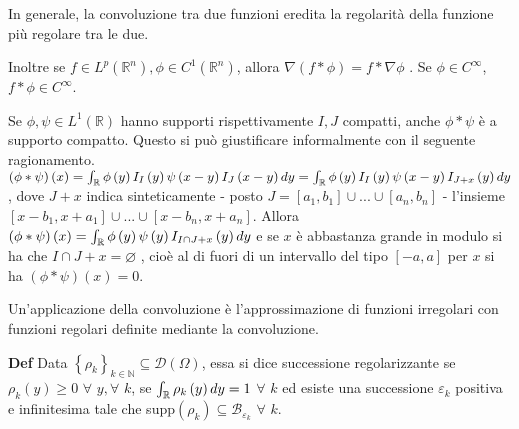\documentclass{article}
\begin{document}
In generale, la convoluzione tra due funzioni eredita la regolarit\`{a}
della funzione pi\`{u} regolare tra le due.

Inoltre se $f\in L^{p}\left( 
\mathbb{R}
^{n}\right) ,\phi \in C^{1}\left( 
\mathbb{R}
^{n}\right) $, allora $\nabla \left( f\ast \phi \right) =f\ast \nabla \phi $%
. Se $\phi \in C^{\infty }$, $f\ast \phi \in C^{\infty }$.

Se $\phi ,\psi \in L^{1}\left( 
\mathbb{R}
\right) $ hanno supporti rispettivamente $I,J$ compatti, anche $\phi \ast
\psi $ \`{e} a supporto compatto. Questo si pu\`{o} giustificare
informalmente con il seguente ragionamento. $\left( \phi \ast \psi \right)
\left( x\right) =\int_{%
\mathbb{R}
}\phi \left( y\right) I_{I}\left( y\right) \psi \left( x-y\right)
I_{J}\left( x-y\right) dy=\int_{%
\mathbb{R}
}\phi \left( y\right) I_{I}\left( y\right) \psi \left( x-y\right)
I_{J+x}\left( y\right) dy$, dove $J+x$ indica sinteticamente - posto $J=%
\left[ a_{1},b_{1}\right] \cup ...\cup \left[ a_{n},b_{n}\right] $ -
l'insieme $\left[ x-b_{1},x+a_{1}\right] \cup ...\cup \left[ x-b_{n},x+a_{n}%
\right] $. Allora $\left( \phi \ast \psi \right) \left( x\right) =\int_{%
\mathbb{R}
}\phi \left( y\right) \psi \left( y\right) I_{I\cap J+x}\left( y\right) dy$
e se $x$ \`{e} abbastanza grande in modulo si ha che $I\cap J+x=\varnothing $%
, cio\`{e} al di fuori di un intervallo del tipo $\left[ -a,a\right] $ per $%
x $ si ha $\left( \phi \ast \psi \right) \left( x\right) =0$.

Un'applicazione della convoluzione \`{e} l'approssimazione di funzioni
irregolari con funzioni regolari definite mediante la convoluzione.

\textbf{Def} Data $\left\{ \rho _{k}\right\} _{k\in 
\mathbb{N}
}\subseteq \mathcal{D}\left( \Omega \right) $, essa si dice successione
regolarizzante se $\rho _{k}\left( y\right) \geq 0$ $\forall $ $y,\forall $ $%
k$, se $\int_{%
\mathbb{R}
}\rho _{k}\left( y\right) dy=1$ $\forall $ $k$ ed esiste una successione $%
\varepsilon _{k}$ positiva e infinitesima tale che supp$\left( \rho
_{k}\right) \subseteq \mathcal{B}_{\varepsilon _{k}}$ $\forall $ $k$.
\end{document}
